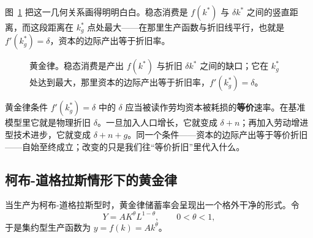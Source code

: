 
图~\ref{fig:macro-3} 把这一几何关系画得明明白白。稳态消费是 $f(k^*)$ 与 $\delta k^*$ 之间的竖直距离，而这段距离在 $k_g^*$ 点处最大——在那里生产函数与折旧线平行，也就是 $f'(k_g^*) = \delta$，资本的边际产出等于折旧率。

\begin{figure}[h]
\centering

\caption{黄金律。稳态消费是产出 $f(k^*)$ 与折旧 $\delta k^*$ 之间的缺口；它在 $k_g^*$ 处达到最大，那里资本的边际产出等于折旧率，$f'(k_g^*) = \delta$。}
\label{fig:macro-3}
\end{figure}

\begin{remark}[“等价”折旧]
黄金律条件 $f'(k_g^*) = \delta$ 中的 $\delta$ 应当被读作劳均资本被耗损的\textbf{等价}速率。在基准模型里它就是物理折旧 $\delta$。一旦加入人口增长，它就变成 $\delta + n$；再加入劳动增进型技术进步，它就变成 $\delta + n + g$。同一个条件——资本的边际产出等于等价折旧——自始至终成立；改变的只是我们往“等价折旧”里代入什么。
\end{remark}

\subsection{柯布-道格拉斯情形下的黄金律}

当生产为柯布-道格拉斯型时，黄金律储蓄率会呈现出一个格外干净的形式。令
\[
Y = A K^{\theta} L^{1-\theta}, \qquad 0 < \theta < 1,
\]
于是集约型生产函数为 $y = f(k) = A k^{\theta}$。


